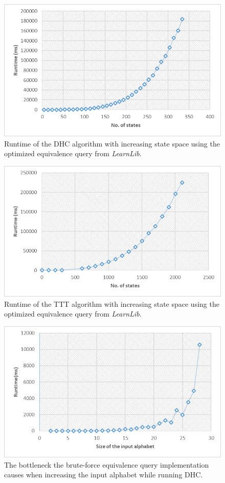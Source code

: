 \begin{figure}
	\centering
	\includegraphics[width=0.7\linewidth]{figures/stateruntimeopt}
	\caption{Runtime of the DHC algorithm with increasing state space using the optimized equivalence query from \emph{LearnLib}.}
	\label{fig:stateruntimeopt}
\end{figure}


\begin{figure}
	\centering
	\includegraphics[width=0.7\linewidth]{figures/stateruntimeoptttt}
	\caption{Runtime of the TTT algorithm with increasing state space using the optimized equivalence query from \emph{LearnLib}.}
	\label{fig:stateruntimeoptttt}
\end{figure}



\begin{figure}
	\centering
	\includegraphics[width=0.7\linewidth]{figures/inputruntime}
	\caption{The bottleneck the brute-force equivalence query implementation causes when increasing the input alphabet while running DHC.}
	\label{fig:inputruntime}
\end{figure}

